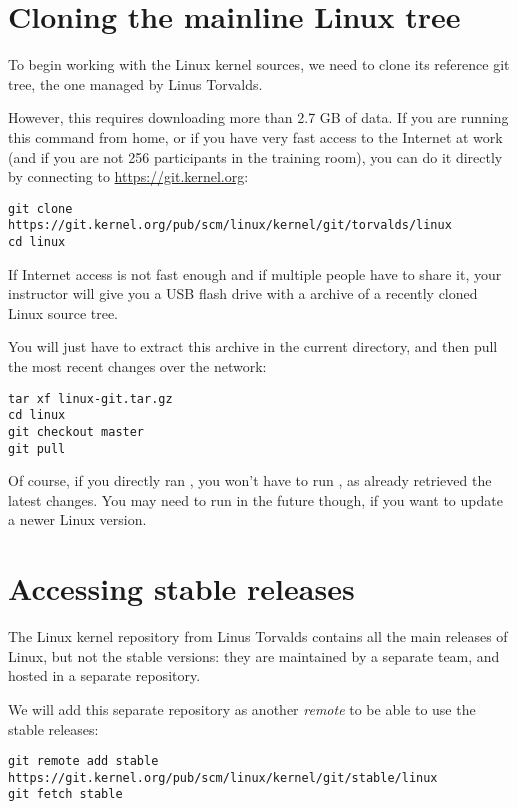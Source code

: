 \section{Cloning the mainline Linux tree}

To begin working with the Linux kernel sources, we need to clone its
reference git tree, the one managed by Linus Torvalds.

However, this requires downloading more than 2.7 GB of data. If you
are running this command from home, or if you have very fast access to
the Internet at work (and if you are not 256 participants in the
training room), you can do it directly by connecting to
\url{https://git.kernel.org}:

\begin{verbatim}
git clone https://git.kernel.org/pub/scm/linux/kernel/git/torvalds/linux
cd linux
\end{verbatim}

If Internet access is not fast enough and if multiple people have to
share it, your instructor will give you a USB flash drive with a
 archive of a recently cloned Linux source tree.

You will just have to extract this archive in the current directory,
and then pull the most recent changes over the network:

\begin{verbatim}
tar xf linux-git.tar.gz
cd linux
git checkout master
git pull
\end{verbatim}

Of course, if you directly ran
, you won't have to run , as
 already retrieved the latest changes. You may need to
run  in the future though, if you want to update a
newer Linux version.

\section{Accessing stable releases}

The Linux kernel repository from Linus Torvalds contains all the main
releases of Linux, but not the stable versions: they are maintained by
a separate team, and hosted in a separate repository.

We will add this separate repository as another {\em remote} to be
able to use the stable releases:

{\small
\begin{verbatim}
git remote add stable https://git.kernel.org/pub/scm/linux/kernel/git/stable/linux
git fetch stable
\end{verbatim}
}

